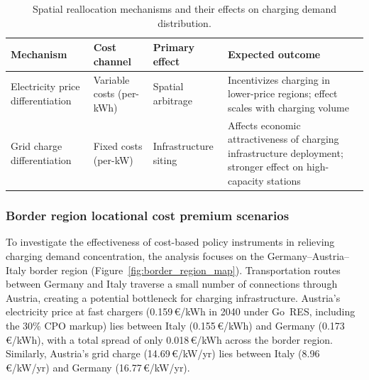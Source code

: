         \begin{table}[H]
        \centering
        \caption{Spatial reallocation mechanisms and their effects on charging demand distribution.}
        \label{tab:reallocation_mechanisms}
        \begin{tabular}{@{}p{2.8cm}p{3.5cm}p{3cm}p{4cm}@{}}
        \toprule
        \textbf{Mechanism} & \textbf{Cost channel} & \textbf{Primary effect} & \textbf{Expected outcome} \\ \midrule
        Electricity price differentiation & Variable costs (per-kWh) & Spatial arbitrage & Incentivizes charging in lower-price regions; effect scales with charging volume \\
        \addlinespace
        Grid charge differentiation & Fixed costs (per-kW) & Infrastructure siting & Affects economic attractiveness of charging infrastructure deployment; stronger effect on high-capacity stations \\
        \bottomrule
        \end{tabular}
        \end{table}

    \subsubsection{Border region locational cost premium scenarios}
    \label{sec:locational_premium_scenarios}
        To investigate the effectiveness of cost-based policy instruments in relieving charging demand concentration, the analysis focuses on the Germany--Austria--Italy border region (Figure~\ref{fig:border_region_map}). Transportation routes between Germany and Italy traverse a small number of connections through Austria, creating a potential bottleneck for charging infrastructure. Austria's electricity price at fast chargers (0.159\,\euro/kWh in 2040 under Go~RES, including the 30\% CPO markup) lies between Italy (0.155\,\euro/kWh) and Germany (0.173\,\euro/kWh), with a total spread of only 0.018\,\euro/kWh across the border region. Similarly, Austria's grid charge (14.69\,\euro/kW/yr) lies between Italy (8.96\,\euro/kW/yr) and Germany (16.77\,\euro/kW/yr).

